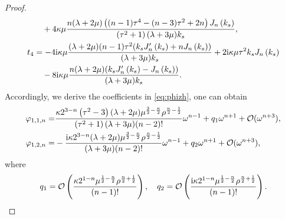 \documentclass[10pt,a4paper]{amsart}
\begin{document}
\begin{proof}
\begin{align}
		&\quad +4 \kappa\mu  \frac{  n (\lambda +2 \mu ) \left((n-1) \tau ^4-(n-3) \tau ^2+2 n\right) J_n\left(k_s\right)}{\left(\tau ^2+1\right) (\lambda +3 \mu ) k_s},\notag\\
		t_{4}&=-4 \mathrm{i} \kappa \mu  \frac{  (\lambda +2 \mu ) (n-1) \tau ^2(k_sJ_n'\left(k_s\right)+nJ_n\left(k_s\right)) }{(\lambda +3 \mu ) k_s}+2 \mathrm{i} \kappa \mu  \tau ^2  k_s J_n\left(k_s\right)\notag\\
		&\quad-8 \mathrm{i} \kappa \mu  \frac{ n (\lambda +2 \mu ) (k_sJ_n'\left(k_s\right)-J_n\left(k_s\right))}{(\lambda +3 \mu ) k_s}.\notag
	\end{align}
	Accordingly, we derive the coefficients in \eqref{eq:phizh}, one can obtain 
	\begin{align}
		\varphi _{1,1,n}=&\frac{\kappa 2^{3-n} \left(\tau ^2-3\right) (\lambda +2 \mu ) \mu ^{\frac{3}{2}-\frac{n}{2}} \rho ^{\frac{n}{2}-\frac{1}{2}}}{\left(\tau ^2+1\right) (\lambda +3 \mu ) (n-2)!}\omega ^{n-1}+q_{1}\omega ^{n+1}+ \mathcal{O}(\omega^{n+3}),\label{eq:x12} \\
		\varphi _{1,2,n}=&-\frac{\mathrm{i} \kappa 2^{3-n} (\lambda +2 \mu ) \mu ^{\frac{3}{2}-\frac{n}{2}} \rho ^{\frac{n}{2}-\frac{1}{2}}}{(\lambda +3 \mu ) (n-2)!}\omega ^{n-1}+q_{2}\omega ^{n+1}+ \mathcal{O}(\omega^{n+3}),\notag
	\end{align}
	where
	\begin{align}\notag
		q_{1}=\mathcal{O}\left(\frac{\kappa 2^{1-n}  \mu ^{\frac{1}{2}-\frac{n}{2}} \rho ^{\frac{n}{2}+\frac{1}{2}}}{(n-1)!}\right),\quad q_{2}=\mathcal{O}\left(\frac{\mathrm{i} \kappa 2^{1-n}  \mu ^{\frac{1}{2}-\frac{n}{2}} \rho ^{\frac{n}{2}+\frac{1}{2}}}{(n-1)!}\right).
	\end{align}
	

\end{proof}
\end{document}
